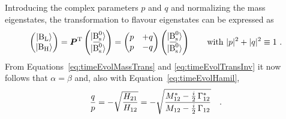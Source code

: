 Introducing the complex parameters $p$ and $q$ and normalizing the mass eigenstates, the transformation to flavour eigenstates can be
expressed as
\begin{equation}
  \label{eq:timeEvolTransInv}
  \begin{pmatrix} \BLst \\ \BHst \end{pmatrix}
    = \vec{P}^\text{T} \begin{pmatrix} \Bsst \\ \Bsbarst \end{pmatrix}
    = \begin{pmatrix} p & +q \\ p & -q \end{pmatrix}
      \begin{pmatrix} \Bsst \\ \Bsbarst \end{pmatrix}
  \qquad
  \text{with } |p|^2+|q|^2\equiv1
  \ .
\end{equation}
From Equations~\ref{eq:timeEvolMassTrans} and \ref{eq:timeEvolTransInv} it now follows that $\alpha=\beta$ and, also with
Equation~\ref{eq:timeEvolHamil},
\begin{equation}
  \frac{q}{p} = -\sqrt{\frac{H_{21}}{H_{12}}} = -\sqrt{\frac{M_{12}^*-\tfrac{i}{2}\,\Gamma_{12}^*}{M_{12}-\tfrac{i}{2}\,\Gamma_{12}}}
  \quad .
\end{equation}

